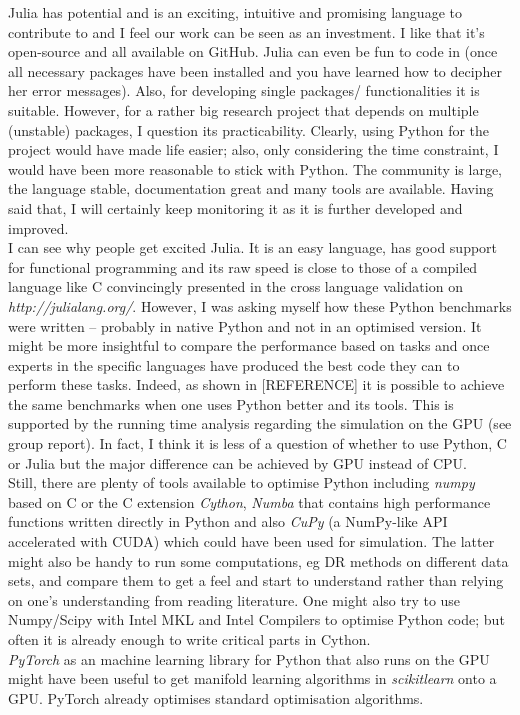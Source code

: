 \documentclass[journal, a4paper]{IEEEtran}
\begin{document}
Julia has potential and is an exciting, intuitive and promising language to contribute to and I feel our work can be seen as an investment. I like that it's open-source and all available on GitHub. Julia can even be fun to code in (once all necessary packages have been installed and you have learned how to decipher her error messages). Also, for developing single packages/ functionalities it is suitable. However, for a rather big research project that depends on multiple (unstable) packages, I question its practicability.
Clearly, using Python for the project would have made life easier; also, only considering the time constraint, I would have been more reasonable to stick with Python. The community is large, the language stable, documentation great and many tools are available. 
Having said that, I will certainly keep monitoring it as it is further developed and improved. \\


I can see why people get excited Julia. It is an easy language, has good support for functional programming and its raw speed is close to those of a compiled language like C convincingly presented in the cross language validation on \textit{http://julialang.org/}. 
However, I was asking myself how these Python benchmarks were written -- probably in native Python and not in an optimised version. It might be more insightful to compare the performance based on tasks and once experts in the specific languages have produced the best code they can to perform these tasks. Indeed, as shown in [REFERENCE] it is possible to achieve the same benchmarks when one uses Python better and its tools. This is supported by the running time analysis regarding the simulation on the GPU (see group report).
In fact, I think it is less of a question of whether to use Python, C or Julia but the major difference can be achieved by GPU instead of CPU.\\
Still, there are plenty of tools available to optimise Python including \textit{numpy} based on C or the C extension \textit{Cython}, \textit{Numba} that contains high performance functions written directly in Python and also \textit{CuPy} (a NumPy-like API accelerated with CUDA) which could have been used for simulation. The latter might also be handy to run some computations, eg DR methods on different data sets, and compare them to get a feel and start to understand rather than relying on one's understanding from reading literature. One might also try to use Numpy/Scipy with Intel MKL and Intel Compilers to optimise Python code; but often it is already enough to write critical parts in Cython.\\
\textit{PyTorch} as an machine learning library for Python that also runs on the GPU might have been useful to get manifold learning algorithms in \textit{scikitlearn} onto a GPU. PyTorch already optimises standard optimisation algorithms.  \\
\end{document}
